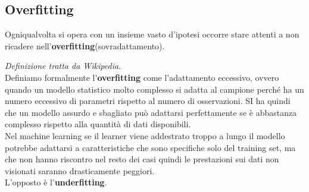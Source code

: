 \subsection{Overfitting}
Ogniqualvolta si opera con un insieme vasto d'ipotesi occorre stare attenti a non ricadere nell'\textbf{overfitting}(sovradattamento).
\begin{definizione}
  \textit{Definizione tratta da Wikipedia.}\\
  Definiamo formalmente l'\textbf{overfitting} come l'adattamento eccessivo,
  ovvero quando 
  un modello statistico molto complesso si adatta al campione perché ha un
  numero eccessivo di parametri rispetto al numero di osservazioni. SI ha
  quindi che un modello assurdo e sbagliato può adattarsi perfettamente se è
  abbastanza complesso rispetto alla quantità di dati disponibili.\\
  Nel machine learning se il learner viene addestrato troppo a lungo il modello
  potrebbe adattarsi a caratteristiche che sono specifiche solo del training
  set, ma che non hanno riscontro nel resto dei casi quindi le prestazioni sui
  dati non visionati saranno drasticamente peggiori.\\
  L'opposto è l'\textbf{underfitting}.
\end{definizione}

